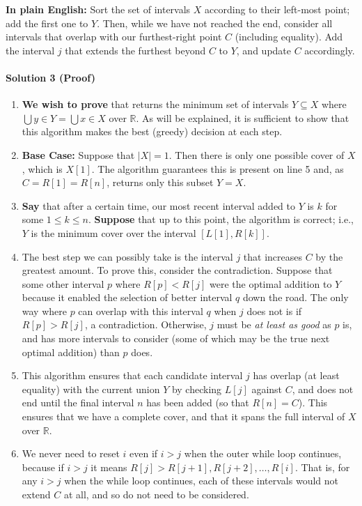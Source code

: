 \documentclass[11pt]{article}
\begin{document}
\textbf{In plain English:} Sort the set of intervals $X$ according to their left-most point; add the first one to $Y$. Then, while we have not reached the end, consider all intervals that overlap with our furthest-right point $C$ (including equality). Add the interval $j$ that extends the furthest beyond $C$ to $Y$, and update $C$ accordingly.

\paragraph{Solution 3 (Proof)}

\begin{enumerate}
    \item \textbf{We wish to prove} that  returns the minimum set of intervals $Y \subseteq X$ where $\bigcup y \in Y = \bigcup x \in X$ over $\mathbb{R}$. As will be explained, it is sufficient to show that this algorithm makes the best (greedy) decision at each step.
    \item \textbf{Base Case:} Suppose that $|X| = 1$. Then there is only one possible cover of $X$, which is $X[1]$. The algorithm guarantees this is present on line 5 and, as $C = R[1] = R[n]$, returns only this subset $Y = X$.
    \item \textbf{Say} that after a certain time, our most recent interval added to $Y$ is $k$ for some $1 \leq k \leq n$. \textbf{Suppose} that up to this point, the algorithm is correct; i.e., $Y$ is the minimum cover over the interval $[L[1], R[k]]$.
    \item The best step we can possibly take is the interval $j$ that increases $C$ by the greatest amount. To prove this, consider the contradiction. Suppose that some other interval $p$ where $R[p] < R[j]$ were the optimal addition to $Y$ because it enabled the selection of better interval $q$ down the road. The only way where $p$ can overlap with this interval $q$ when $j$ does not is if $R[p] > R[j]$, a contradiction. Otherwise, $j$ must be \textit{at least as good} as $p$ is, and has more intervals to consider (some of which may be the true next optimal addition) than $p$ does.
    \item This algorithm ensures that each candidate interval $j$ has overlap (at least equality) with the current union $Y$ by checking $L[j]$ against $C$, and does not end until the final interval $n$ has been added (so that $R[n] = C$). This ensures that we have a complete cover, and that it spans the full interval of $X$ over $\mathbb{R}$.
    \item We never need to reset $i$ even if $i > j$ when the outer while loop continues, because if $i > j$ it means $R[j] > R[j + 1], R[j + 2], \dots, R[i]$. That is, for any $i > j$ when the while loop continues, each of these intervals would not extend $C$ at all, and so do not need to be considered.
\end{enumerate}
\end{document}

